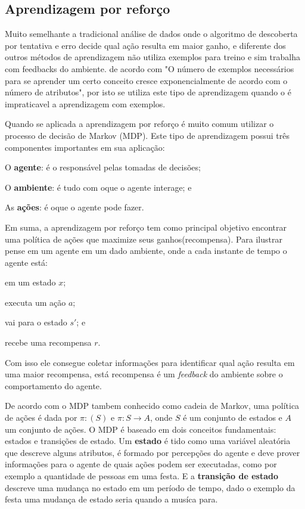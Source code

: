 \subsection{Aprendizagem por reforço}
\label{subsec:reforcing-learning}
 
Muito semelhante a tradicional análise de dados onde o algoritmo de descoberta por tentativa e erro
decide qual ação resulta em maior ganho, e diferente dos outros métodos de aprendizagem não utiliza exemplos para treino
e sim trabalha com feedbacks do ambiente. de acordo com \cite{Valiant:1984:TL:1968.1972} "O número de exemplos necessários para 
se aprender um certo conceito cresce exponencialmente de acordo com o número de atributos", por isto se utiliza este tipo de aprendizagem
quando o é impraticavel a aprendizagem com exemplos.


Quando se aplicada a aprendizagem por reforço é muito comum utilizar o processo de decisão de Markov (MDP). 
Este tipo de aprendizagem possui três componentes importantes em sua aplicação:

\begin{alineas}
	\item O \textbf{agente}: é o responsável pelas tomadas de decisões;
	\item O \textbf{ambiente}: é tudo com oque o agente interage; e
	\item As \textbf{ações}: é oque o agente pode fazer.
\end{alineas}  
 
 
 Em suma, a aprendizagem por reforço tem como principal objetivo encontrar uma política de ações que maximize seus ganhos(recompensa). Para ilustrar 
 pense em um agente em um dado ambiente, onde a cada instante de tempo o agente está:   

\begin{alineas}
	\item em um estado $x$;
	\item executa um ação $a$;
	\item vai para o estado $s'$; e
	\item recebe uma recompensa $r$.
\end{alineas}


Com isso ele consegue coletar informações para identificar qual ação resulta em uma maior recompensa,
está recompensa é um \textit{feedback} do ambiente sobre o comportamento do agente. 
 
De acordo com o MDP tambem conhecido como cadeia de Markov, uma política de ações é dada por $\pi: (S)$
e $\pi: S \rightarrow A $, onde $S$ é um conjunto de estados e $A$ um conjunto de ações. 
O MDP é baseado em dois conceitos fundamentais: \cite{hordijk1992} estados e transições de estado.
Um \textbf{estado} é tido como uma variável aleatória que descreve alguns atributos, é formado por percepções do agente e deve
prover informações para o agente de quais ações podem ser executadas, como por exemplo a quantidade de pessoas em uma festa.
E a \textbf{transição de estado} descreve uma mudança no estado em um período de tempo, 
dado o exemplo da festa uma mudança de estado seria quando a musíca para.

